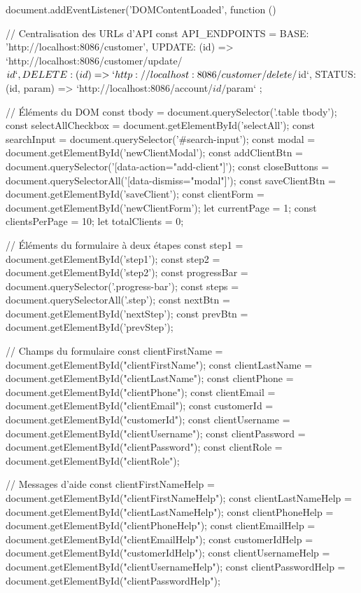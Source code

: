 document.addEventListener('DOMContentLoaded', function () {
    // Centralisation des URLs d'API
    const API_ENDPOINTS = {
        BASE: 'http://localhost:8086/customer',
        UPDATE: (id) => `http://localhost:8086/customer/update/${id}`,
        DELETE: (id) => `http://localhost:8086/customer/delete/${id}`,
        STATUS: (id, param) => `http://localhost:8086/account/${id}/${param}`
    };

    // Éléments du DOM
    const tbody = document.querySelector('.table tbody');
    const selectAllCheckbox = document.getElementById('selectAll');
    const searchInput = document.querySelector('#search-input');
    const modal = document.getElementById('newClientModal');
    const addClientBtn = document.querySelector('[data-action="add-client"]');
    const closeButtons = document.querySelectorAll('[data-dismiss="modal"]');
    const saveClientBtn = document.getElementById('saveClient');
    const clientForm = document.getElementById('newClientForm');
    let currentPage = 1;
    const clientsPerPage = 10;
    let totalClients = 0;

    // Éléments du formulaire à deux étapes
    const step1 = document.getElementById('step1');
    const step2 = document.getElementById('step2');
    const progressBar = document.querySelector('.progress-bar');
    const steps = document.querySelectorAll('.step');
    const nextBtn = document.getElementById('nextStep');
    const prevBtn = document.getElementById('prevStep');

    // Champs du formulaire
    const clientFirstName = document.getElementById("clientFirstName");
    const clientLastName = document.getElementById("clientLastName");
    const clientPhone = document.getElementById("clientPhone");
    const clientEmail = document.getElementById("clientEmail");
    const customerId = document.getElementById("customerId");
    const clientUsername = document.getElementById("clientUsername");
    const clientPassword = document.getElementById("clientPassword");
    const clientRole = document.getElementById("clientRole");

    // Messages d'aide
    const clientFirstNameHelp = document.getElementById("clientFirstNameHelp");
    const clientLastNameHelp = document.getElementById("clientLastNameHelp");
    const clientPhoneHelp = document.getElementById("clientPhoneHelp");
    const clientEmailHelp = document.getElementById("clientEmailHelp");
    const customerIdHelp = document.getElementById("customerIdHelp");
    const clientUsernameHelp = document.getElementById("clientUsernameHelp");
    const clientPasswordHelp = document.getElementById("clientPasswordHelp");

}
